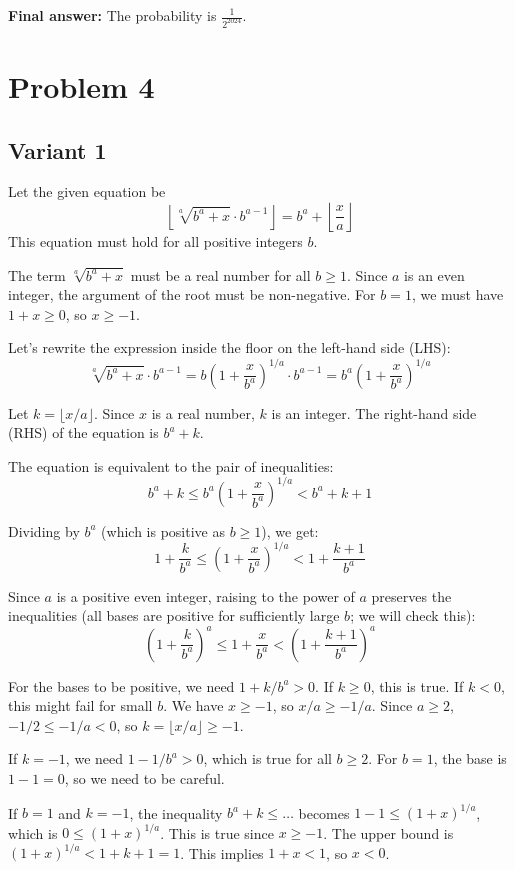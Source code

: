 \documentclass[12pt,a4paper]{article}
\theoremstyle{definition}
\begin{document}
        \textbf{Final answer:}
        The probability is $\frac{1}{2^{2024}}$.


\section{Problem 4}
    \subsection{Variant 1}
    Let the given equation be
    \[ \left\lfloor \sqrt[a]{b^a + x} \cdot b^{a-1} \right\rfloor = b^a + \left\lfloor \frac{x}{a} \right\rfloor \]
    This equation must hold for all positive integers $b$.

    The term $\sqrt[a]{b^a+x}$ must be a real number for all $b \ge 1$. Since $a$ is an even integer, the argument of the root must be non-negative. For $b=1$, we must have $1+x \ge 0$, so $x \ge -1$.

    Let's rewrite the expression inside the floor on the left-hand side (LHS):
    \[ \sqrt[a]{b^a + x} \cdot b^{a-1} = b\left(1 + \frac{x}{b^a}\right)^{1/a} \cdot b^{a-1} = b^a \left(1 + \frac{x}{b^a}\right)^{1/a} \]

    Let $k = \lfloor x/a \rfloor$. Since $x$ is a real number, $k$ is an integer. The right-hand side (RHS) of the equation is $b^a+k$.

    The equation is equivalent to the pair of inequalities:
    \[ b^a+k \le b^a \left(1 + \frac{x}{b^a}\right)^{1/a} < b^a+k+1 \]

    Dividing by $b^a$ (which is positive as $b \ge 1$), we get:
    \[ 1+\frac{k}{b^a} \le \left(1 + \frac{x}{b^a}\right)^{1/a} < 1+\frac{k+1}{b^a} \]

    Since $a$ is a positive even integer, raising to the power of $a$ preserves the inequalities (all bases are positive for sufficiently large $b$; we will check this):
    \[ \left(1+\frac{k}{b^a}\right)^a \le 1 + \frac{x}{b^a} < \left(1+\frac{k+1}{b^a}\right)^a \]

    For the bases to be positive, we need $1+k/b^a > 0$. If $k \ge 0$, this is true. If $k < 0$, this might fail for small $b$. We have $x \ge -1$, so $x/a \ge -1/a$. Since $a \ge 2$, $-1/2 \le -1/a < 0$, so $k=\lfloor x/a \rfloor \ge -1$.

    If $k=-1$, we need $1-1/b^a > 0$, which is true for all $b \ge 2$. For $b=1$, the base is $1-1=0$, so we need to be careful.

    If $b=1$ and $k=-1$, the inequality $b^a+k \le \dots$ becomes $1-1 \le (1+x)^{1/a}$, which is $0 \le (1+x)^{1/a}$. This is true since $x \ge -1$. The upper bound is $(1+x)^{1/a} < 1+k+1 = 1$. This implies $1+x<1$, so $x<0$.
\end{document}

